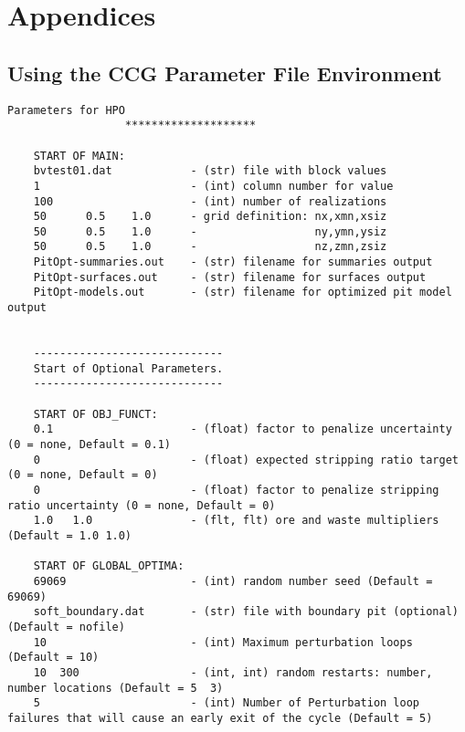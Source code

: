 
\chapter{Appendices}
\label{ch:append}

\section{Using the CCG Parameter File Environment}
\label{sect:parm_file}


\begin{framed}
    \begin{lstlisting}[style=ccgParameterfile]
                   Parameters for HPO
                  ********************

    START OF MAIN:
    bvtest01.dat            - (str) file with block values
    1                       - (int) column number for value
    100                     - (int) number of realizations
    50      0.5    1.0      - grid definition: nx,xmn,xsiz
    50      0.5    1.0      -                  ny,ymn,ysiz
    50      0.5    1.0      -                  nz,zmn,zsiz
    PitOpt-summaries.out    - (str) filename for summaries output
    PitOpt-surfaces.out     - (str) filename for surfaces output
    PitOpt-models.out       - (str) filename for optimized pit model output


    -----------------------------
    Start of Optional Parameters.
    -----------------------------

    START OF OBJ_FUNCT:
    0.1                     - (float) factor to penalize uncertainty (0 = none, Default = 0.1)
    0                       - (float) expected stripping ratio target (0 = none, Default = 0)
    0                       - (float) factor to penalize stripping ratio uncertainty (0 = none, Default = 0)
    1.0   1.0               - (flt, flt) ore and waste multipliers (Default = 1.0 1.0)

    START OF GLOBAL_OPTIMA:
    69069                   - (int) random number seed (Default = 69069)
    soft_boundary.dat       - (str) file with boundary pit (optional) (Default = nofile)
    10                      - (int) Maximum perturbation loops (Default = 10)
    10  300                 - (int, int) random restarts: number, number locations (Default = 5  3)
    5                       - (int) Number of Perturbation loop failures that will cause an early exit of the cycle (Default = 5)


\end{lstlisting}
\end{framed}
